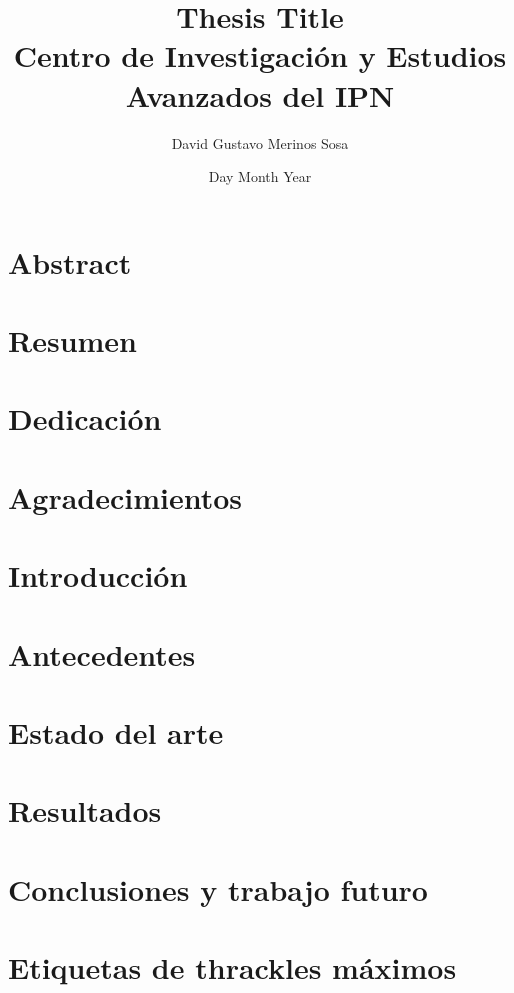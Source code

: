 \documentclass[12pt]{book}
\title{
{Thesis Title}\\
{\large Centro de Investigación y Estudios Avanzados del IPN}
}
\author{David Gustavo Merinos Sosa}
\date{Day Month Year}
\theoremstyle{definition}
\begin{document}
\maketitle
\chapter*{Abstract}
\chapter*{Resumen}
\chapter*{Dedicación}
\chapter*{Agradecimientos}
\tableofcontents

\chapter{Introducción}

\chapter{Antecedentes}

\chapter{Estado del arte}
\label{cap3}
\chapter{Resultados}\label{cap4}

\chapter{Conclusiones y trabajo futuro}

\appendix
\chapter{Etiquetas de thrackles máximos}



\end{document}

